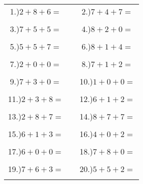 \documentclass{article}
\begin{document}
\begin{tabular}{ccc}
1.)$2+8+6=$& \hspace{5cm} &2.)$7+4+7=$\\\\
3.)$7+5+5=$& \hspace{5cm} &4.)$8+2+0=$\\\\
5.)$5+5+7=$& \hspace{5cm} &6.)$8+1+4=$\\\\
7.)$2+0+0=$& \hspace{5cm} &8.)$7+1+2=$\\\\
9.)$7+3+0=$& \hspace{5cm} &10.)$1+0+0=$\\\\
11.)$2+3+8=$& \hspace{5cm} &12.)$6+1+2=$\\\\
13.)$2+8+7=$& \hspace{5cm} &14.)$8+7+7=$\\\\
15.)$6+1+3=$& \hspace{5cm} &16.)$4+0+2=$\\\\
17.)$6+0+0=$& \hspace{5cm} &18.)$7+8+0=$\\\\
19.)$7+6+3=$& \hspace{5cm} &20.)$5+5+2=$\\\\
\end{tabular}
\newpage
\end{document}
